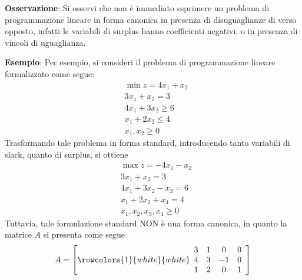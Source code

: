 \documentclass[a4paper]{extarticle}
\begin{document}
\vspace{2em}
\noindent
\textbf{Osservazione}: Si osservi che non è immediato esprimere un problema di programmazione lineare in forma canonica in presenza di disuguaglianze di verso opposto, infatti le variabili di surplus hanno coefficienti negativi, o in presenza di vincoli di uguaglianza.

\vspace{2em}
\noindent
\textbf{Esempio}: Per esempio, si consideri il problema di programmazione lineare formalizzato come segue:
\begin{align*}
    & \min z = 4x_1+x_2\\
    & 3x_1+x_2=3\\
    & 4x_1+3x_2 \geq 6\\
    & x_1+2x_2 \leq 4\\
    &x_1,x_2 \geq 0
\end{align*}
Trasformando tale problema in forma standard, introducendo tanto variabili di slack, quanto di surplus, si ottiene
\begin{align*}
    & \max z = -4x_1-x_2\\
    & 3x_1+x_2=3\\
    & 4x_1+3x_2-x_3=6\\
    & x_1+2x_2+x_4=4\\
    &x_1,x_2,x_3,x_4 \geq 0
\end{align*}
Tuttavia, tale formulazione standard NON è una forma canonica, in quanto la matrice $A$ si presenta come segue
\[
    A = \left[
    \rowcolors{1}{white}{white}
    \begin{array}{cccc}
        3 & 1 & 0 & 0\\
        4 & 3 & -1 & 0\\
        1 & 2 & 0 & 1
    \end{array}
\right]
\]
\end{document}
